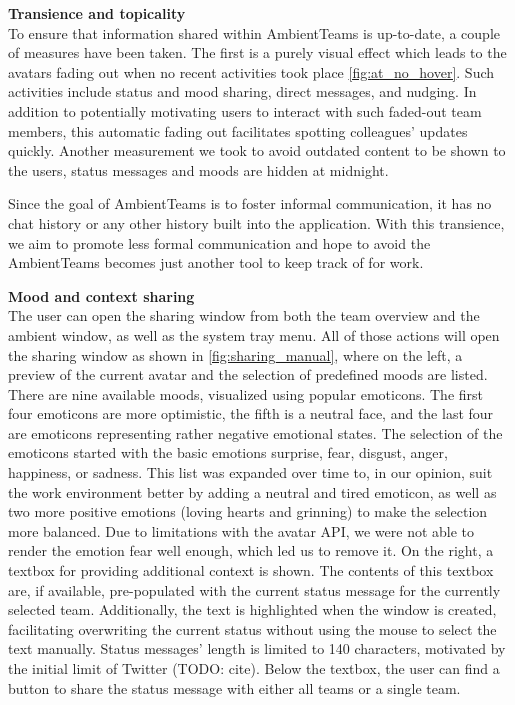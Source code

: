 \medskip\noindent\textbf{Transience and topicality} \\
To ensure that information shared within AmbientTeams is up-to-date, a couple of measures have been taken. The first is a purely visual effect which leads to the avatars fading out when no recent activities took place \autoref{fig:at_no_hover}. Such activities include status and mood sharing, direct messages, and nudging. In addition to potentially motivating users to interact with such faded-out team members, this automatic fading out facilitates spotting colleagues' updates quickly. Another measurement we took to avoid outdated content to be shown to the users, status messages and moods are hidden at midnight.

Since the goal of AmbientTeams is to foster informal communication, it has no chat history or any other history built into the application. With this transience, we aim to promote less formal communication and hope to avoid the AmbientTeams becomes just another tool to keep track of for work.


\medskip\noindent\textbf{Mood and context sharing} \\
The user can open the sharing window from both the team overview and the ambient window, as well as the system tray menu. All of those actions will open the sharing window as shown in \autoref{fig:sharing_manual}, where on the left, a preview of the current avatar and the selection of predefined moods are listed. There are nine available moods, visualized using popular emoticons. The first four emoticons are more optimistic, the fifth is a neutral face, and the last four are emoticons representing rather negative emotional states. The selection of the emoticons started with the basic emotions surprise, fear, disgust, anger, happiness, or sadness. This list was expanded over time to, in our opinion, suit the work environment better by adding a neutral and tired emoticon, as well as two more positive emotions (loving hearts and grinning) to make the selection more balanced. Due to limitations with the avatar API, we were not able to render the emotion fear well enough, which led us to remove it. On the right, a textbox for providing additional context is shown. The contents of this textbox are, if available, pre-populated with the current status message for the currently selected team. Additionally, the text is highlighted when the window is created, facilitating overwriting the current status without using the mouse to select the text manually. Status messages' length is limited to 140 characters, motivated by the initial limit of Twitter (TODO: cite). Below the textbox, the user can find a button to share the status message with either all teams or a single team.

